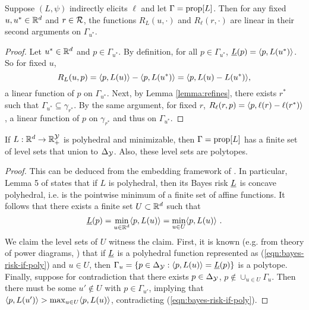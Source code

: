 \begin{lemma*}
  Suppose $(L,\psi)$ indirectly elicits $\ell$ and let $\Gamma = \mathrm{prop}[L]$.
  Then for any fixed $u,u^* \in \mathbb{R}^d$ and $r \in \mathcal{R}$, the functions $R_L(u,\cdot)$ and $R_{\ell}(r,\cdot)$ are linear in their second arguments on $\Gamma_{u^*}$.
\end{lemma*}
\begin{proof}
  Let $u^* \in \mathbb{R}^d$ and $p \in \Gamma_{u^*}$.
  By definition, for all $p \in \Gamma_{u^*}$, $\underline{L}(p) = \langle p, L(u^*) \rangle$.
  So for fixed $u$,
    \[ R_L(u,p) = \langle p, L(u) \rangle - \langle p, L(u^*) \rangle = \langle p, L(u) - L(u^*) \rangle , \]
  a linear function of $p$ on $\Gamma_{u^*}$.
  Next, by Lemma \ref{lemma:refines}, there exists $r^*$ such that $\Gamma_{u^*} \subseteq \gamma_{r^*}$.
  By the same argument, for fixed $r$, $R_{\ell}(r,p) = \langle p, \ell(r) - \ell(r^*) \rangle$, a linear function of $p$ on $\gamma_{r^*}$ and thus on $\Gamma_{u^*}$.
\end{proof}

\begin{lemma*}
  If $L: \mathbb{R}^d \to \mathbb{R}_+^{\mathcal{Y}}$ is polyhedral and minimizable, then $\Gamma = \mathrm{prop}[L]$ has a finite set of level sets that union to $\Delta_{\mathcal{Y}}$. Also, these level sets are polytopes.
\end{lemma*}
\begin{proof}
  This can be deduced from the embedding framework of \cite{finocchiaro2019embedding}.
  In particular, Lemma 5 of \cite{finocchiaro2019embedding} states that if $L$ is polyhedral, then its Bayes risk $\underline{L}$ is concave polyhedral, i.e. is the pointwise minimum of a finite set of affine functions.
  It follows that there exists a finite set $U \subset \mathbb{R}^d$ such that
  \begin{equation} \label{eqn:bayes-risk-if-poly}
    \underline{L}(p) = \min_{u \in \mathbb{R}^d} \langle p, L(u) \rangle = \min_{u \in U} \langle p, L(u) \rangle ~.
  \end{equation}
  We claim the level sets of $U$ witness the claim.
  First, it is known (e.g. from theory of power diagrams, \cite{aurenhammer1987criterion}) that if $\underline{L}$ is a polyhedral function represented as (\ref{eqn:bayes-risk-if-poly}) and $u \in U$, then $\Gamma_u = \{p \in \Delta_{\mathcal{Y}}: \langle p, L(u) \rangle = \underline{L}(p)\}$ is a polytope.
  Finally, suppose for contradiction that there exists $p \in \Delta_{\mathcal{Y}}$, $p \not\in \cup_{u \in U} \Gamma_u$.
  Then there must be some $u' \not\in U$ with $p \in \Gamma_{u'}$, implying that $\langle p, L(u') \rangle > \max_{u \in U} \langle p, L(u) \rangle$, contradicting (\ref{eqn:bayes-risk-if-poly}).
\end{proof}

